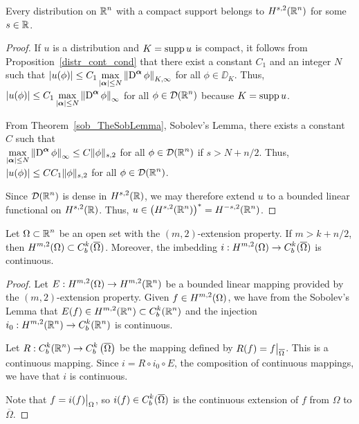 \begin{cor} \label{sob_TheSobLemma_Cor1}
Every distribution on $\displaystyle \mathbb{R}^n$ with a compact support belongs to
$\displaystyle H^{s,2}(\mathbb{R}^n)$ for some $s\in \mathbb{R}$.
\end{cor}

\begin{proof}
If $u$ is a distribution and $K = \operatorname{supp} u$ is compact, it follows from
Proposition~\ref{distr_cont_cond} that there exist a constant $C_1$ and 
an integer $N$ such that
$\displaystyle \left| u(\phi) \right| \leq C_1 \max_{|{\bm{\alpha}}|\leq N}
\left\| \operatorname{D}^{{\bm{\alpha}}} \phi \right\|_{K,\infty}$ for all $\phi \in \DD_K$.
Thus,
$\displaystyle \left| u(\phi) \right| \leq C_1 \max_{|{\bm{\alpha}}|\leq N}
\left\| \operatorname{D}^{{\bm{\alpha}}} \phi \right\|_{\infty}$
for all $\displaystyle \phi \in \mathcal{D}(\mathbb{R}^n)$ because $K = \operatorname{supp} u$.

From Theorem~\ref{sob_TheSobLemma}, Sobolev's Lemma, there exists a
constant $C$ such that\\
$\displaystyle \max_{|{\bm{\alpha}}|\leq N}
\left\| \operatorname{D}^{{\bm{\alpha}}} \phi \right\|_{\infty} \leq C \|\phi\|_{s,2}$
for all $\displaystyle \phi \in \mathcal{D}(\mathbb{R}^n)$ if $s > N+ n/2$.  Thus,
$\displaystyle \left| u(\phi) \right| \leq C C_1 \|\phi\|_{s,2}$
for all $\displaystyle \phi \in \mathcal{D}(\mathbb{R}^n)$.

Since $\displaystyle \mathcal{D}(\mathbb{R}^n)$ is dense in
$\displaystyle H^{s,2}(\mathbb{R})$, we may
therefore extend $u$ to a bounded linear functional on
$\displaystyle H^{s,2}(\mathbb{R})$.  Thus,
$\displaystyle u \in \left( H^{s,2}(\mathbb{R}^n) \right)^\ast = H^{-s,2}(\mathbb{R}^n)$.
\end{proof}

\begin{cor} \label{sob_TheSobLemma_cor1}
Let $\displaystyle \Omega \subset \mathbb{R}^n$ be an open set with the
$(m,2)$-extension property. If $m>k +n/2$, then
$\displaystyle H^{m,2}(\Omega) \subset C_b^k(\overline{\Omega})$.
Moreover, the imbedding
$\displaystyle i:H^{m,2}(\Omega) \to C_b^k(\overline{\Omega})$
is continuous.
\end{cor}

\begin{proof}
Let $\displaystyle E:H^{m,2}(\Omega) \rightarrow H^{m,2}(\mathbb{R}^n)$ be a bounded
linear mapping provided by the $(m,2)$-extension property.  Given
$\displaystyle f\in H^{m,2}(\Omega)$, we have from the Sobolev's Lemma that
$\displaystyle E(f) \in H^{m,2}(\mathbb{R}^n) \subset C^k_b(\mathbb{R}^n)$ and the
injection $\displaystyle i_0:H^{m,2}(\mathbb{R}^n) \to C_b^k(\mathbb{R}^n)$ is
continuous.

Let $\displaystyle R: C_b^k(\mathbb{R}^n) \to C_b^k\left(\overline{\Omega}\right)$
be the mapping defined by $\displaystyle R(f) = f\big|_{\overline{\Omega}}$.
This is a continuous mapping.
Since $i = R\circ i_0 \circ E$, the composition of continuous mappings,
we have that $i$ is continuous.

Note that $\displaystyle f = i(f)\big|_{\Omega}$, so
$\displaystyle i(f) \in C^k_b(\overline{\Omega})$
is the continuous extension of $f$ from $\Omega$ to $\overline{\Omega}$.
\end{proof}

